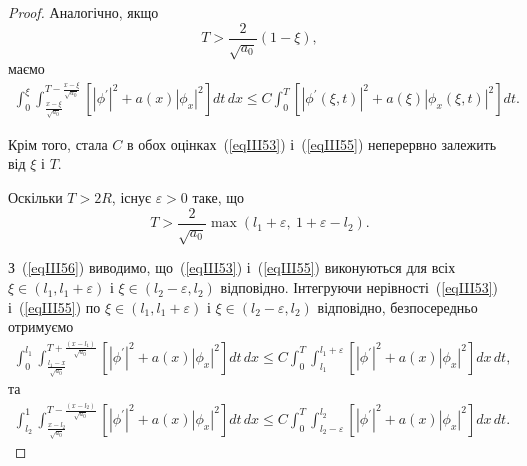 \begin{proof}
Аналогічно, якщо
\begin{equation}\label{eqIII54}
    T > \frac{2}{\sqrt{a_0}} (1-\xi),
\end{equation}
маємо
\begin{equation}\label{eqIII55}
\begin{split}
    \int^\xi_0 \int^{T - \frac{x-\xi}{\sqrt{a_0}}}_{\frac{x-\xi}{\sqrt{a_0}}}
    \left[|\phi^\prime|^2 + a(x)|\phi_x|^2\right] dt\, dx
    \leq C \int^T_0 \left[|\phi^\prime(\xi,t)|^2 + a(\xi)|\phi_x(\xi,t)|^2\right] dt.
\end{split}
\end{equation}

Крім того, стала $C$ в обох оцінках~(\ref{eqIII53}) і~(\ref{eqIII55}) неперервно залежить від $\xi$ і $T$.

Оскільки $T>2R$, існує $\varepsilon >0$ таке, що
\begin{equation}\label{eqIII56}
    T > \frac{2}{\sqrt{a_0}} \max(l_1+\varepsilon,\ 1 + \varepsilon -l_2).
\end{equation}

З~(\ref{eqIII56}) виводимо, що~(\ref{eqIII53}) і~(\ref{eqIII55}) виконуються для всіх $\xi \in (l_1, l_1 + \varepsilon)$ і $\xi \in (l_2 - \varepsilon, l_2)$ відповідно. Інтегруючи нерівності~(\ref{eqIII53}) і~(\ref{eqIII55}) по $\xi \in (l_1, l_1 + \varepsilon)$ і $\xi \in (l_2 - \varepsilon, l_2)$ відповідно, безпосередньо отримуємо
\begin{equation}\label{eqIII57}
    \begin{split}
    \int^{l_1}_0 \int^{T + \frac{(x-l_1)}{\sqrt{a_0}}}_{\frac{l_1-x}{\sqrt{a_0}}}
    \left[|\phi^\prime|^2 + a(x)|\phi_x|^2\right] dt\, dx
    \leq C \int^T_0 \int^{l_1+\varepsilon}_{l_1}
    \left[|\phi^\prime|^2 + a(x)|\phi_x|^2\right] dx\, dt,
    \end{split}
\end{equation}
та
\begin{equation}\label{eqIII58}
\begin{split}
    \int^1_{l_2} \int^{T - \frac{(x-l_2)}{\sqrt{a_0}}}_{\frac{x-l_2}{\sqrt{a_0}}}
    \left[|\phi^\prime|^2 + a(x)|\phi_x|^2\right] dt\, dx
    \leq C \int^T_0 \int^{l_2}_{l_2-\varepsilon} \left[|\phi^\prime|^2 + a(x)|\phi_x|^2\right] dx\, dt.
\end{split}
\end{equation}


\end{proof}
